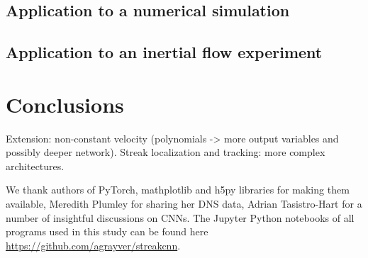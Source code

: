 \documentclass{svjour3}                     %
\begin{document}
\subsection{Application to a numerical simulation}

\subsection{Application to an inertial flow experiment}

\section{Conclusions}

Extension: non-constant velocity (polynomials -> more output variables and possibly deeper network).
Streak localization and tracking: more complex architectures.

\begin{acknowledgements}
We thank authors of PyTorch, mathplotlib and h5py libraries for making them available, Meredith Plumley for sharing her DNS data, Adrian Tasistro-Hart for a number of insightful discussions on CNNs. The Jupyter Python notebooks of all programs used in this study can be found here \url{https://github.com/agrayver/streakcnn}.
\end{acknowledgements}





\end{document}
